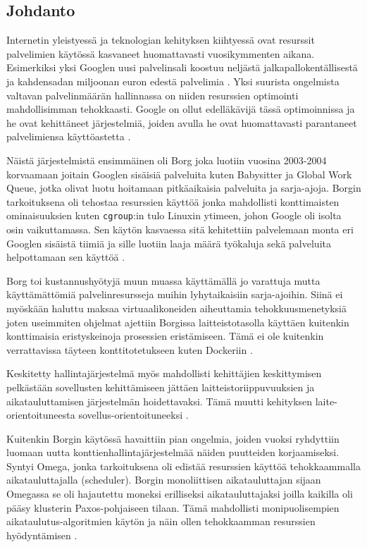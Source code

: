 \documentclass[finnish]{tktltiki2}
\theoremstyle{definition}
\theoremstyle{remark}
\begin{document}
\subsection{Johdanto}

Internetin yleistyessä ja teknologian kehityksen kiihtyessä ovat resurssit palvelimien käytössä kasvaneet huomattavasti vuosikymmenten aikana. Esimerkiksi yksi Googlen uusi palvelinsali koostuu neljästä jalkapallokentällisestä ja kahdensadan miljoonan euron edestä palvelimia \cite{borg-goto-youtube}. Yksi suurista ongelmista valtavan palvelinmäärän hallinnassa on niiden resurssien optimointi mahdollisimman tehokkaasti. Google on ollut edelläkävijä tässä optimoinnissa ja he ovat kehittäneet järjestelmiä, joiden avulla he ovat huomattavasti parantaneet palvelimiensa käyttöastetta \cite{borg-omega-kubernetes}.

Näistä järjestelmistä ensimmäinen oli Borg joka luotiin vuosina 2003-2004 korvaamaan joitain Googlen sisäisiä palveluita kuten Babysitter ja Global Work Queue, jotka olivat luotu hoitamaan pitkäaikaisia palveluita ja sarja-ajoja. Borgin tarkoituksena oli tehostaa resurssien käyttöä jonka mahdollisti konttimaisten ominaisuuksien kuten \texttt{cgroup}:in tulo Linuxin ytimeen, johon Google oli isolta osin vaikuttamassa. Sen käytön kasvaessa sitä kehitettiin palvelemaan monta eri Googlen sisäistä tiimiä ja sille luotiin laaja määrä työkaluja sekä palveluita helpottamaan sen käyttöä
\cite{borg-omega-kubernetes}.

Borg toi kustannushyötyjä muun muassa käyttämällä jo varattuja mutta käyttämättömiä palvelinresursseja muihin lyhytaikaisiin sarja-ajoihin. Siinä ei myöskään haluttu maksaa virtuaalikoneiden aiheuttamia tehokkuusmenetyksiä joten useimmiten ohjelmat ajettiin Borgissa laitteistotasolla käyttäen kuitenkin konttimaisia eristyskeinoja prosessien eristämiseen. Tämä ei ole kuitenkin verrattavissa täyteen konttitotetukseen kuten Dockeriin \cite{management-with-borg}.

Keskitetty hallintajärjestelmä myös mahdollisti kehittäjien keskittymisen pelkästään sovellusten kehittämiseen jättäen laitteistoriippuvuuksien ja aikatauluttamisen järjestelmän hoidettavaksi. Tämä muutti kehityksen laite-orientoituneesta sovellus-orientoituneeksi \cite{borg-omega-kubernetes}.

Kuitenkin Borgin käytössä havaittiin pian ongelmia, joiden vuoksi ryhdyttiin luomaan uutta konttienhallintajärjestelmää näiden puutteiden korjaamiseksi. Syntyi Omega, jonka tarkoituksena oli edistää resurssien käyttöä tehokkaammalla aikatauluttajalla (scheduler). Borgin monoliittisen aikatauluttajan sijaan Omegassa se oli hajautettu moneksi erilliseksi aikatauluttajaksi joilla kaikilla oli pääsy klusterin Paxos-pohjaiseen tilaan. Tämä mahdollisti monipuolisempien aikataulutus-algoritmien käytön ja näin ollen tehokkaamman resurssien hyödyntämisen \cite{omega}.
\end{document}
